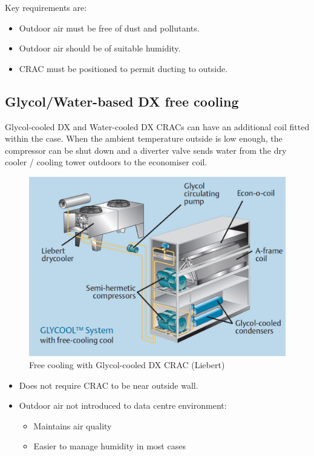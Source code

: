 \documentclass{pgnotes}
\begin{document}
Key requirements are:
\begin{itemize}
\item Outdoor air must be free of dust and pollutants.
\item Outdoor air should be of suitable humidity.
\item CRAC must be positioned to permit ducting to outside.
\end{itemize}


\subsection{Glycol/Water-based DX free cooling}

Glycol-cooled DX and Water-cooled DX CRACs can have an additional coil fitted within the case.
When the ambient temperature outside is low enough, the compressor can be shut down and a diverter valve sends water from the dry cooler / cooling tower outdoors to the economiser coil.

\begin{figure}[htbp]
  \centering
  \includegraphics[width=0.75\linewidth]{glycool_liebert}
  \caption{Free cooling with Glycol-cooled DX CRAC (Liebert)}
  \label{fig:glycol-free-cooling}
\end{figure}

\begin{itemize}
\item Does not require CRAC to be near outside wall.
\item Outdoor air not introduced to data centre environment:
  \begin{itemize}
  \item Maintains air quality
  \item Easier to manage humidity in most cases
  \end{itemize}
\end{itemize}





\end{document}
